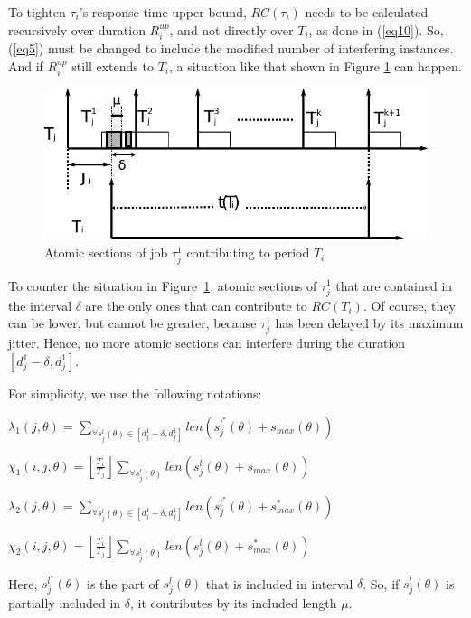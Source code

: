 \documentclass{sig-alternate}
\begin{document}
To tighten $\tau_{i}$'s response time upper bound, $RC(\tau_i)$ needs to be calculated recursively over duration $R_i^{up}$, 
and not directly over $T_i$, as done in (\ref{eq10}). So, (\ref{eq5}) must be changed to include the modified number of interfering instances. And if $R_i^{up}$ still extends to $T_i$, a situation like that shown in Figure
\ref{fig10} can happen.
\begin{figure}
\centering{}\includegraphics[scale=0.5]{figures/figure10}\caption{\label{fig10} Atomic sections of job $\tau_{j}^{1}$ contributing to period $T_i$}
\end{figure}


To counter the situation in Figure~\ref{fig10}, atomic sections of $\tau_{j}^{1}$ that are contained in the interval $\delta$
are the only ones that can contribute to $RC(T_{i})$. Of course, they can be lower, but cannot be greater, because $\tau_{j}^{1}$ has been delayed by its maximum jitter. Hence, no more atomic sections
can interfere during the duration 
$[d_j^1 -\delta,d_j^1]$.

For simplicity, we use the following notations:
\begin{compactitem}
\item $\lambda_{1}\left(j,\theta\right)=\sum_{\forall s_{j}^{l}\left(\theta\right)\in\left[d_j^1-\delta,d_j^1\right]}len\left(s_{j}^{l^{*}}\left(\theta\right)+s_{max}\left(\theta\right)\right)$
\item $\chi_{1}\left(i,j,\theta\right)=\left\lfloor\frac{T_{i}}{T_{j}}\right\rfloor\sum_{\forall s_{j}^{l}\left(\theta\right)}len\left(s_{j}^{l}\left(\theta\right)+s_{max}\left(\theta\right)\right)$
\item $\lambda_{2}\left(j,\theta\right)=\sum_{\forall s_{j}^{l}\left(\theta\right)\in\left[d_{j}^{1}-\delta,d_{j}^{1}\right]}len\left(s_{j}^{l^{*}}\left(\theta\right)+s_{max}^{*}\left(\theta\right)\right)$
\item $\chi_{2}\left(i,j,\theta\right)=\left\lfloor\frac{T_{i}}{T_{j}}\right\rfloor\sum_{\forall s_{j}^{l}\left(\theta\right)}len\left(s_{j}^{l}\left(\theta\right)+s_{max}^{*}\left(\theta\right)\right)$
\end{compactitem}
Here, $s_{j}^{l^{*}}\left(\theta\right)$ is the part of $s_{j}^{l}\left(\theta\right)$ that
is included in interval $\delta$. So, if $s_j^l (\theta)$ is partially included in $\delta$, it contributes by its included length $\mu$.
\end{document}
